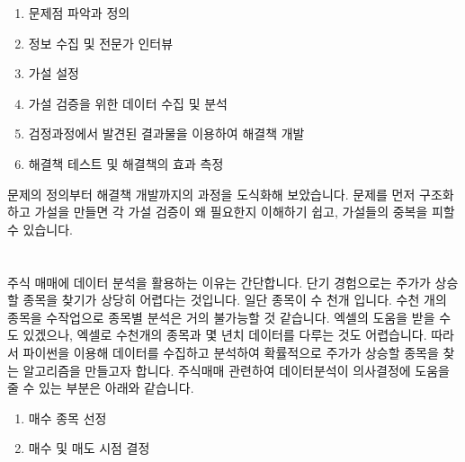 \documentclass[letterpaper,10pt,english]{jupyterBook}
\begin{document}
\begin{enumerate}
%
\item {} 
\sphinxAtStartPar
문제점 파악과 정의

\item {} 
\sphinxAtStartPar
정보 수집 및 전문가 인터뷰

\item {} 
\sphinxAtStartPar
가설 설정

\item {} 
\sphinxAtStartPar
가설 검증을 위한 데이터 수집 및 분석

\item {} 
\sphinxAtStartPar
검정과정에서 발견된 결과물을 이용하여 해결책 개발

\item {} 
\sphinxAtStartPar
해결책 테스트 및 해결책의 효과 측정

\end{enumerate}

\sphinxAtStartPar
 문제의 정의부터 해결책 개발까지의 과정을 도식화해 보았습니다. 문제를 먼저 구조화하고 가설을 만들면 각 가설 검증이 왜 필요한지 이해하기 쉽고, 가설들의 중복을 피할 수 있습니다.

\sphinxAtStartPar


\sphinxAtStartPar


\sphinxAtStartPar


\sphinxAtStartPar


\sphinxAtStartPar



\chapter{}
\label{\detokenize{chapter4/4.1.0_My_Strategy:id1}}\label{\detokenize{chapter4/4.1.0_My_Strategy::doc}}
\sphinxAtStartPar
주식 매매에 데이터 분석을 활용하는 이유는 간단합니다. 단기 경험으로는 주가가 상승할 종목을 찾기가 상당히 어렵다는 것입니다. 일단 종목이 수 천개 입니다. 수천 개의 종목을 수작업으로 종목별 분석은 거의 불가능할 것 같습니다. 엑셀의 도움을 받을 수 도 있겠으나, 엑셀로 수천개의 종목과 몇 년치 데이터를 다루는 것도 어렵습니다.  따라서 파이썬을 이용해 데이터를 수집하고 분석하여 확률적으로 주가가 상승할 종목을 찾는 알고리즘을 만들고자 합니다. 주식매매 관련하여 데이터분석이 의사결정에 도움을 줄 수 있는 부분은 아래와 같습니다.
\begin{enumerate}
%
\item {} 
\sphinxAtStartPar
매수 종목 선정

\item {} 
\sphinxAtStartPar
매수 및 매도 시점 결정

\end{enumerate}
\end{document}
